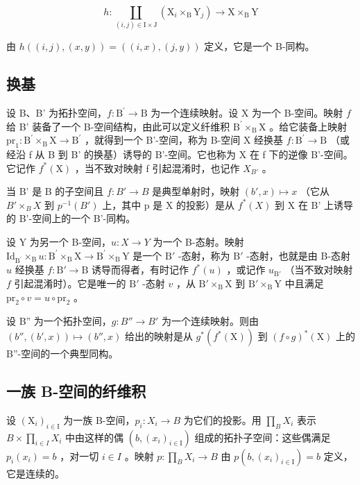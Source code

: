 \[
h \colon \coprod_ {(i, j) \in \mathrm{I} \times \mathrm{J}} (\mathrm{X} _ {i} \times_ {\mathrm{B}} \mathrm{Y} _ {j}) \to \mathrm{X} \times_ {\mathrm{B}} \mathrm{Y}
\]

由 \(h((i,j),(x,y)) = ((i,x),(j,y))\) 定义，它是一个 B-同构。

\subsection{换基}

设 B、B' 为拓扑空间，\(f\colon\mathrm{B}^{\prime}\to\mathrm{B}\) 为一个连续映射。设 X 为一个 B-空间。映射 \(f\) 给 B' 装备了一个 B-空间结构，由此可以定义纤维积 \(\mathrm{B}^{\prime}\times_{\mathrm{B}}\mathrm{X}\) 。给它装备上映射 \(\mathrm{pr}_{1}\colon\mathrm{B}^{\prime}\times_{\mathrm{B}}\mathrm{X}\to\mathrm{B}^{\prime}\) ，就得到一个 B'-空间，称为 B-空间 X 经换基 \(f\colon\mathrm{B}^{\prime}\to\mathrm{B}\) （或经沿 f 从 B 到 B' 的换基）诱导的 B'-空间。它也称为 X 在 f 下的逆像 B'-空间。它记作 \(f^{*}(\mathrm{X})\) ，当不致对映射 f 引起混淆时，也记作 \(X_{B'}\) 。

当 B' 是 B 的子空间且 \(f: B' \to B\) 是典型单射时，映射 \((b', x) \mapsto x\) （它从 \(B' \times_{B} X\) 到 \(p^{-1}(B')\) 上，其中 p 是 X 的投影）是从 \(f^{*}(X)\) 到 X 在 B' 上诱导的 B'-空间上的一个 B'-同构。

设 Y 为另一个 B-空间，\(u\colon X\to Y\) 为一个 B-态射。映射 \(\mathrm{Id}_{\mathrm{B}^{\prime}}\times_{\mathrm{B}}u\colon \mathrm{B}^{\prime}\times_{\mathrm{B}}\mathrm{X}\to \mathrm{B}^{\prime}\times_{\mathrm{B}}\mathrm{Y}\) 是一个 \(\mathrm{B}'\) -态射，称为 \(\mathrm{B}'\) -态射，也就是由 B-态射 \(u\) 经换基 \(f\colon \mathrm{B}'\to \mathrm{B}\) 诱导而得者，有时记作 \(f^{*}(u)\) ，或记作 \(u_{\mathrm{B}'}\) （当不致对映射 \(f\) 引起混淆时）。它是唯一的 \(\mathrm{B}'\) -态射 \(v\) ，从 \(\mathrm{B}'\times_{\mathrm{B}}\mathrm{X}\) 到 \(\mathrm{B}'\times_{\mathrm{B}}\mathrm{Y}\) 中且满足 \(\mathrm{pr}_2\circ v = u\circ \mathrm{pr}_2\) 。

设 B'' 为一个拓扑空间，\(g: B'' \to B'\) 为一个连续映射。则由 \((b'', (b', x)) \mapsto (b'', x)\) 给出的映射是从 \(g^{*}(f^{*}(\mathrm{X}))\) 到 \((f \circ g)^{*}(\mathrm{X})\) 上的 B''-空间的一个典型同构。

\subsection{一族 B-空间的纤维积}

设 \((\mathrm{X}_{i})_{i\in\mathrm{I}}\) 为一族 B-空间，\(p_{i}\colon X_{i}\to B\) 为它们的投影。用 \(\prod_{B}X_{i}\) 表示 \(B\times\prod_{i\in I}X_{i}\) 中由这样的偶 \((b,(x_{i})_{i\in\mathrm{I}})\) 组成的拓扑子空间：这些偶满足 \(p_{i}(x_{i})=b\) ，对一切 \(i\in I\) 。映射 \(p\colon\prod_{B}X_{i}\to B\) 由 \(p(b,(x_{i})_{i\in\mathrm{I}})=b\) 定义，它是连续的。

